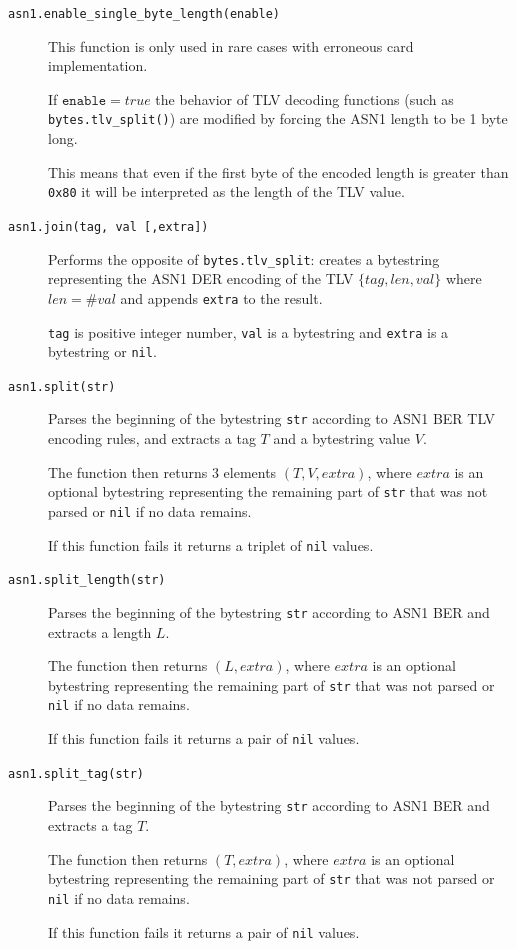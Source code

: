 \documentclass[11pt]{report}
\begin{document}
\begin{description}

\item[\texttt{asn1.enable\_single\_byte\_length(enable)}]
{
  This function is only used in rare cases with erroneous card implementation.
  
  If $\texttt{enable}=true$ the behavior of TLV decoding functions 
  (such as \texttt{bytes.tlv\_split()}) are modified by forcing the ASN1 
  length to be 1 byte long. 
  
  This means that even if the first byte of the encoded length is greater 
  than \texttt{0x80} it will be interpreted as the length of the TLV value.
}

\item[\texttt{asn1.join(tag, val [,extra])}]
{
  Performs the opposite of \texttt{bytes.tlv\_split}: creates a bytestring 
  representing the ASN1 DER encoding of the TLV $\{tag,len,val\}$ where $len=\#val$ 
  and appends \texttt{extra} to the result.

  \texttt{tag} is positive integer number, \texttt{val} is a bytestring and 
  \texttt{extra} is a bytestring or \texttt{nil}.
}

\item[\texttt{asn1.split(str)}]
{
  Parses the beginning of the bytestring \texttt{str} according to ASN1 BER 
  TLV encoding rules, and extracts a tag $T$ and a bytestring value $V$.

  The function then returns 3 elements $(T, V, extra)$, 
  where $extra$ is an optional bytestring representing the remaining part of 
  \texttt{str} that was not parsed or \texttt{nil} if no data remains.

  If this function fails it returns a triplet of \texttt{nil} values.
}	

\item[\texttt{asn1.split\_length(str)}]
{
  Parses the beginning of the bytestring \texttt{str} according to ASN1 BER 
  and extracts a length $L$. 

  The function then returns $(L, extra)$, where $extra$ is an optional bytestring 
  representing the remaining part of \texttt{str} that was not parsed or \texttt{nil} 
  if no data remains.

  If this function fails it returns a pair of \texttt{nil} values.
}

\item[\texttt{asn1.split\_tag(str)}]
{
  Parses the beginning of the bytestring \texttt{str} according to ASN1 BER 
  and extracts a tag $T$. 

  The function then returns $(T, extra)$, where $extra$ is an optional bytestring 
  representing the remaining part of \texttt{str} that was not parsed or 
  \texttt{nil} if no data remains.

  If this function fails it returns a pair of \texttt{nil} values.
}

\end{description}
\end{document}
